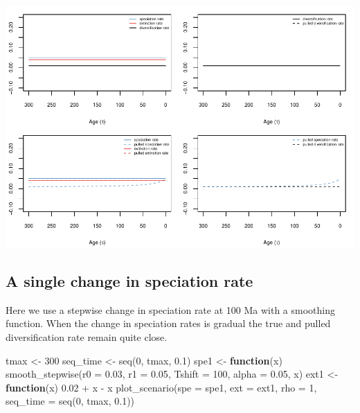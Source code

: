 \documentclass[
]{article}
\newenvironment{Shaded}{\begin{snugshade}}{\end{snugshade}}
\newcommand{\AttributeTok}[1]{\textcolor[rgb]{0.77,0.63,0.00}{#1}}
\newcommand{\ControlFlowTok}[1]{\textcolor[rgb]{0.13,0.29,0.53}{\textbf{#1}}}
\newcommand{\DecValTok}[1]{\textcolor[rgb]{0.00,0.00,0.81}{#1}}
\newcommand{\FloatTok}[1]{\textcolor[rgb]{0.00,0.00,0.81}{#1}}
\newcommand{\FunctionTok}[1]{\textcolor[rgb]{0.00,0.00,0.00}{#1}}
\newcommand{\NormalTok}[1]{#1}
\newcommand{\OtherTok}[1]{\textcolor[rgb]{0.56,0.35,0.01}{#1}}
\newcommand{\SpecialCharTok}[1]{\textcolor[rgb]{0.00,0.00,0.00}{#1}}
\begin{document}
\includegraphics{supplement_files/figure-latex/unnamed-chunk-5-1.pdf}

\pagebreak

\hypertarget{a-single-change-in-speciation-rate}{%
\subsection{A single change in speciation
rate}\label{a-single-change-in-speciation-rate}}

Here we use a stepwise change in speciation rate at 100 Ma with a
smoothing function. When the change in speciation rates is gradual the
true and pulled diversification rate remain quite close.

\begin{Shaded}
\begin{Highlighting}[]
\NormalTok{tmax }\OtherTok{\textless{}{-}} \DecValTok{300}
\NormalTok{seq\_time }\OtherTok{\textless{}{-}} \FunctionTok{seq}\NormalTok{(}\DecValTok{0}\NormalTok{, tmax, }\FloatTok{0.1}\NormalTok{)}
\NormalTok{spe1 }\OtherTok{\textless{}{-}} \ControlFlowTok{function}\NormalTok{(x) }\FunctionTok{smooth\_stepwise}\NormalTok{(}\AttributeTok{r0 =} \FloatTok{0.03}\NormalTok{, }\AttributeTok{r1 =} \FloatTok{0.05}\NormalTok{, }\AttributeTok{Tshift =} \DecValTok{100}\NormalTok{,}
    \AttributeTok{alpha =} \FloatTok{0.05}\NormalTok{, x)}
\NormalTok{ext1 }\OtherTok{\textless{}{-}} \ControlFlowTok{function}\NormalTok{(x) }\FloatTok{0.02} \SpecialCharTok{+}\NormalTok{ x }\SpecialCharTok{{-}}\NormalTok{ x}
\FunctionTok{plot\_scenario}\NormalTok{(}\AttributeTok{spe =}\NormalTok{ spe1, }\AttributeTok{ext =}\NormalTok{ ext1, }\AttributeTok{rho =} \DecValTok{1}\NormalTok{, }\AttributeTok{seq\_time =} \FunctionTok{seq}\NormalTok{(}\DecValTok{0}\NormalTok{,}
\NormalTok{    tmax, }\FloatTok{0.1}\NormalTok{))}
\end{Highlighting}
\end{Shaded}
\end{document}

